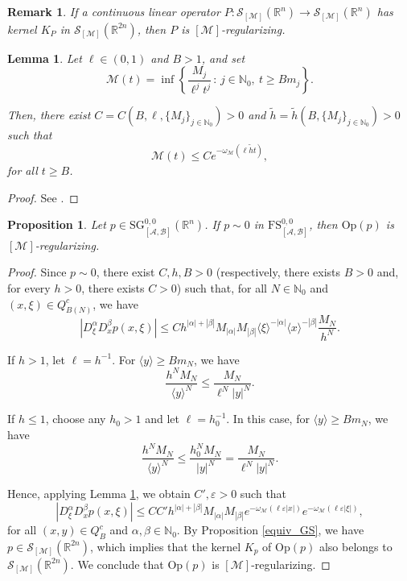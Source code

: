 \documentclass[11pt,reqno]{amsart}
\numberwithin{equation}{section}
\newtheorem{lemma}[theorem]{Lemma}
\newtheorem{proposition}[theorem]{Proposition}
\newtheorem{remark}[theorem]{Remark}
\newcommand{\R}{{\mathbb{R}}} %
\newcommand{\N}{{\mathbb{N}}} %
\newcommand{\caS}{{\mathcal{S}}}
\newcommand{\Op}{{\mathrm{Op}}}
\newcommand{\SG}{{\mathrm{SG}}}
\newcommand{\FS}{{\mathrm{FS}}}
\newcommand{\Mj}{{\{M_j\}_{j\in\mathbb{N}_0}}} %
\newcommand{\M}{{\mathcal{M}}} %
\newcommand{\A}{{\mathcal{A}}} %
\newcommand{\B}{{\mathcal{B}}} %
\begin{document}
\begin{remark} 
	If a continuous linear operator $P:\caS_{[\M]}(\R^n)\to \caS_{[\M]}(\R^n)$ has kernel $K_P$ in $\caS_{[\M]}(\R^{2n})$, then $P$ is $[\M]$-regularizing.
\end{remark}


\begin{lemma}\label{lemma_pran}
	Let $\ell\in (0,1)$ and $B>1$, and set
	\[\mathscr{M}(t) = \inf\left\{\frac{M_j}{\ell^j t^j}\,:\, j\in\N_0,\ t\geq Bm_j\right\}.\]
	
	Then, there exist $C=C(B,\ell,\Mj)>0$ and $\tilde{h}=\tilde{h}(B,\Mj)>0$ such that
	\[\mathscr{M}(t) \leq Ce^{-\omega_{\M}(\ell \tilde h t)},\]
	for all $t\geq B$.
\end{lemma}
\begin{proof} 
	See \cite[Lemma 8]{Pran2013}.
\end{proof}



\begin{proposition}\label{exp_0_reg}
	Let $p\in {\SG}_{[\A,\B]}^{0,0}(\R^n)$. If $p\sim 0$ in $\FS_{[\A,\B]}^{0,0}$, then $\Op(p)$ is $[\M]$-regularizing.
\end{proposition}
%
\begin{proof}
	Since $p\sim 0$, there exist $C,h,B>0$ (respectively, there exists $B>0$ and, for every $h>0$, there exists $C>0$) such that, for all $N\in\N_0$ and $(x,\xi)\in Q_{B(N)}^c$, we have
	\begin{equation*}
		|D_\xi^\alpha D_x^\beta p(x,\xi)| \leq Ch^{|\alpha|+|\beta|}M_{|\alpha|}M_{|\beta|}\langle\xi\rangle^{-|\alpha|}\langle x\rangle^{-|\beta|}\frac{M_N}{h^N}.
	\end{equation*}
	
	If $h>1$, let $\ell=h^{-1}$. For $\langle y\rangle\geq Bm_N$, we have
	\[\frac{h^NM_N}{\langle y\rangle^N} \leq \frac{M_N}{\ell^N|y|^N}.\]
	
	If $h\leq 1$, choose any $h_0>1$ and let $\ell=h_0^{-1}$. In this case, for $\langle y\rangle\geq Bm_N$, we have
	\[\frac{h^NM_N}{\langle y\rangle^N} \leq \frac{h_0^NM_N}{|y|^N} = \frac{M_N}{\ell^N|y|^N}.\]
	
	Hence, applying Lemma \ref{lemma_pran}, we obtain $C',\varepsilon>0$ such that
	\[ |D_\xi^\alpha D_x^\beta p(x,\xi)| \leq CC'h^{|\alpha|+|\beta|}M_{|\alpha|}M_{|\beta|} e^{-\omega_{\M}(\ell\varepsilon|x|)}e^{-\omega_{\M}(\ell\varepsilon|\xi|)},\]
	for all $(x,y)\in Q_B^c$ and $\alpha,\beta\in\N_0$. By Proposition \ref{equiv_GS}, we have $p\in\caS_{[\M]}(\R^{2n})$, which implies that the kernel $K_p$ of $\Op(p)$ also belongs to $\caS_{[\M]}(\R^{2n})$. We conclude that $\Op(p)$ is $[\M]$-regularizing.
\end{proof}
\end{document}
